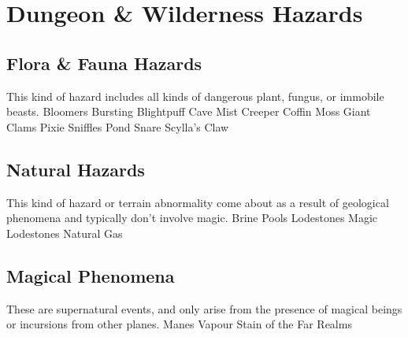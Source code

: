 \documentclass[10pt,a4paper,twoside,twocolumn,openany,bg=print,nodeprecatedcode]{dndbook}
\begin{document}
\chapter{Dungeon \& Wilderness Hazards}
\section{Flora \& Fauna Hazards}
This kind of hazard includes all kinds of dangerous plant, fungus, or immobile beasts.
Bloomers
Bursting Blightpuff
Cave Mist Creeper
Coffin Moss
Giant Clams
Pixie Sniffles
Pond Snare
Scylla's Claw
\section{Natural Hazards}
This kind of hazard or terrain abnormality come about as a result of geological phenomena and typically don't involve magic. 
Brine Pools
Lodestones
Magic Lodestones
Natural Gas
\section{Magical Phenomena}
These are supernatural events, and only arise from the presence of magical beings or incursions from other planes.
Manes Vapour
Stain of the Far Realms
\end{document}
